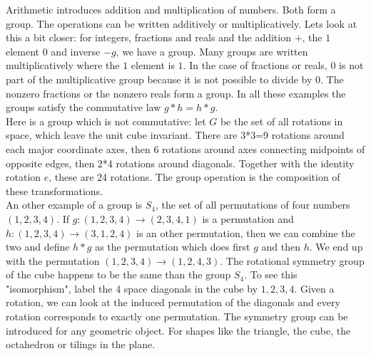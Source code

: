 \documentclass[12pt]{amsart}
\newcounter{example}    \def\example#1{ \item \fontsize{12}{15} \selectfont #1 \fontsize{12}{15} \selectfont }
\begin{document}
Arithmetic introduces addition and multiplication of numbers. 
Both form a group. The operations can be written additively or multiplicatively. 
Lets look at this a bit closer: for integers, fractions and reals and the addition $+$,
the $1$ element $0$ and inverse $-g$, we have a group.
Many groups are written multiplicatively where the $1$ element is $1$. 
In the case of fractions or reals, $0$ is not part of the multiplicative group
because it is not possible to divide by $0$. The nonzero fractions or the nonzero 
reals form a group. 
In all these examples the groups satisfy the commutative law $g*h = h*g$. \\
Here is a group which is not commutative: let $G$ be the set of all rotations in space, which 
leave the unit cube invariant. There are 3*3=9 rotations around
each major coordinate axes, then 6 rotations around axes connecting midpoints of opposite edges,
then 2*4 rotations around diagonals. Together with the identity rotation $e$, these are
24 rotations. The group operation is the composition of these transformations.  \\
An other example of a group is $S_4$, the set of all permutations of 
four numbers $(1,2,3,4)$. If $g: (1,2,3,4) \to (2,3,4,1)$ is a permutation and 
$h: (1,2,3,4) \to (3,1,2,4)$ is an other permutation, then we can combine the two 
and define $h * g$ as the permutation which does first $g$ and then $h$. We end up 
with the permutation $(1,2,3,4) \to (1,2,4,3)$. 
The rotational symmetry group of the cube happens to be the same than the group $S_4$. 
To see this "isomorphism", label the 4 space diagonals in the cube by $1,2,3,4$. 
Given a rotation, we can look at the induced permutation of the diagonals and
every rotation corresponds to exactly one permutation. 
The symmetry group can be introduced for any geometric object. For shapes like the triangle, the cube,
the octahedron or tilings in the plane. 

\begin{center}  \end{center}
\end{document}
